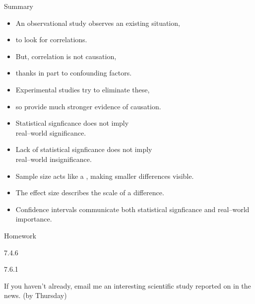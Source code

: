 \begin{frame}{Summary}
  \begin{itemize}
    \item An \alert{observational study} observes an existing situation,
    \item to look for correlations.
    \item But, \alert{correlation is not causation},
    \item thanks in part to \alert{confounding factors}.
    \item \alert{Experimental studies} try to eliminate these,
    \item so provide much stronger evidence of causation.
  \end{itemize}

    \vspace{1em}

    \begin{itemize}
        \item Statistical signficance \alert{does not imply} \\real--world significance.
        \item Lack of statistical signficance \alert{does not imply} \\real--world insignificance.
        \item Sample size acts like a , making smaller differences visible.
        \item The \alert{effect size} describes the scale of a difference.
        \item Confidence intervals communicate both statistical signficance and real--world importance.
    \end{itemize}
\end{frame}

\begin{frame}{Homework}

  \begin{center}

    7.4.6

  \vspace{2em}

    7.6.1

  \vspace{2em}

  If you haven't already, email me an interesting scientific study reported on in the news.  (by Thursday)

  \end{center}

\end{frame}









